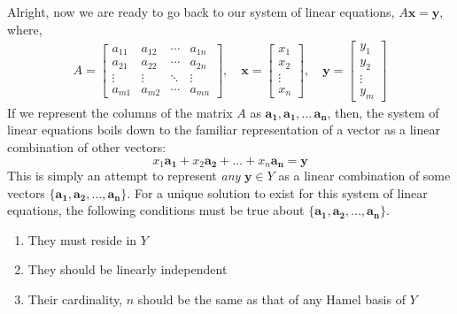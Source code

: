 Alright, now we are ready to go back to our system of linear equations, \( A\mathbf{x}=\mathbf{y} \), where, 
	\begin{align*}
	A=
	\begin{bmatrix}
	a_{11} & a_{12} & \cdots & a_{1n} \\
	a_{21} & a_{22} & \cdots & a_{2n} \\
	\vdots & \vdots & \ddots & \vdots \\
	a_{m1} & a_{m2} & \cdots & a_{mn}
	\end{bmatrix},\quad
	\mathbf{x}=
	\begin{bmatrix}
	x_1 \\
	x_2 \\
	\vdots \\
	x_n
	\end{bmatrix},\quad
	\mathbf{y}=
	\begin{bmatrix}
	y_1 \\
	y_2 \\
	\vdots \\
	y_m
	\end{bmatrix}
	\end{align*}
If we represent the columns of the matrix \(A\) as \( \mathbf{a_1}, \mathbf{a_1}, \ldots\, \mathbf{a_n} \), then, the system of linear equations boils down to the familiar representation of a vector as a linear combination of other vectors:
	\[ x_1\mathbf{a_1} + x_2\mathbf{a_2} + \ldots + x_n\mathbf{a_n} = \mathbf{y} \]
This is simply an attempt to represent \emph{any} \(\mathbf{y} \in Y\) as a linear combination of some vectors \( \{\mathbf{a_1}, \mathbf{a_2}, \ldots, \mathbf{a_n}\} \).  For a unique solution to exist for this system of linear equations, the following conditions must be true about \( \{\mathbf{a_1}, \mathbf{a_2}, \ldots, \mathbf{a_n}\} \).
	\begin{enumerate}
	\item They must reside in \(Y\)
	\item They should be linearly independent
	\item Their cardinality, \(n\) should be the same as that of any Hamel basis of \(Y\)
	\end{enumerate}
	
